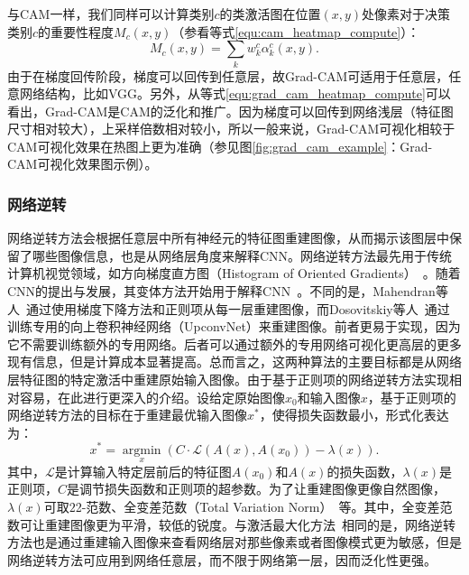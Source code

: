 与CAM一样，我们同样可以计算类别$c$的类激活图在位置$(x,y)$处像素对于决策类别$c$的重要性程度$M_c(x, y)$（参看等式\ref{equ:cam_heatmap_compute}）：
\begin{equation}\label{equ:grad_cam_heatmap_compute}
M_{c}(x, y)=\sum_{k} w_{k}^{c} \alpha_{k}^c(x, y).
\end{equation}
由于在梯度回传阶段，梯度可以回传到任意层，故Grad-CAM可适用于任意层，任意网络结构，比如VGG。另外，从等式\ref{equ:grad_cam_heatmap_compute}可以看出，Grad-CAM是CAM的泛化和推广。因为梯度可以回传到网络浅层（特征图尺寸相对较大），上采样倍数相对较小，所以一般来说，Grad-CAM可视化相较于CAM可视化效果在热图上更为准确（参见图\ref{fig:grad_cam_example}：Grad-CAM可视化效果图示例）。
\subsubsection{网络逆转}
网络逆转方法会根据任意层中所有神经元的特征图重建图像，从而揭示该图层中保留了哪些图像信息，也是从网络层角度来解释CNN。网络逆转方法最先用于传统计算机视觉领域，如方向梯度直方图（Histogram of Oriented Gradients）~\cite{dalal2005histograms}。随着CNN的提出与发展，其变体方法开始用于解释CNN~\cite{mahendran2015understanding, mahendran2016visualizing, dosovitskiy2016inverting}。不同的是，Mahendran等人~\cite{mahendran2015understanding, mahendran2016visualizing}通过使用梯度下降方法和正则项从每一层重建图像，而Dosovitskiy等人~\cite{dosovitskiy2016inverting}通过训练专用的向上卷积神经网络（UpconvNet）来重建图像。前者更易于实现，因为它不需要训练额外的专用网络。后者可以通过额外的专用网络可视化更高层的更多现有信息，但是计算成本显著提高。总而言之，这两种算法的主要目标都是从网络层特征图的特定激活中重建原始输入图像。由于基于正则项的网络逆转方法实现相对容易，在此进行更深入的介绍。设给定原始图像$x_0$和输入图像$x$，基于正则项的网络逆转方法的目标在于重建最优输入图像$x^*$，使得损失函数最小，形式化表达为：
\begin{equation*}
x^{*}=\underset{x}{\operatorname{argmin}}\left(C \cdot \mathcal{L}\left(A(x), A\left(x_{0}\right)\right)-\lambda(x)\right).
\end{equation*}
其中，$\mathcal{L}$是计算输入特定层前后的特征图$A(x_0)$和$A(x)$的损失函数，$\lambda(x)$是正则项，$C$是调节损失函数和正则项的超参数。为了让重建图像更像自然图像，$\lambda(x)$可取$2$2-范数、全变差范数（Total Variation Norm）~\cite{rudin1992nonlinear}等。其中，全变差范数可让重建图像更为平滑，较低的锐度。与激活最大化方法~\cite{simonyan2013deep}相同的是，网络逆转方法也是通过重建输入图像来查看网络层对那些像素或者图像模式更为敏感，但是网络逆转方法可应用到网络任意层，而不限于网络第一层，因而泛化性更强。
